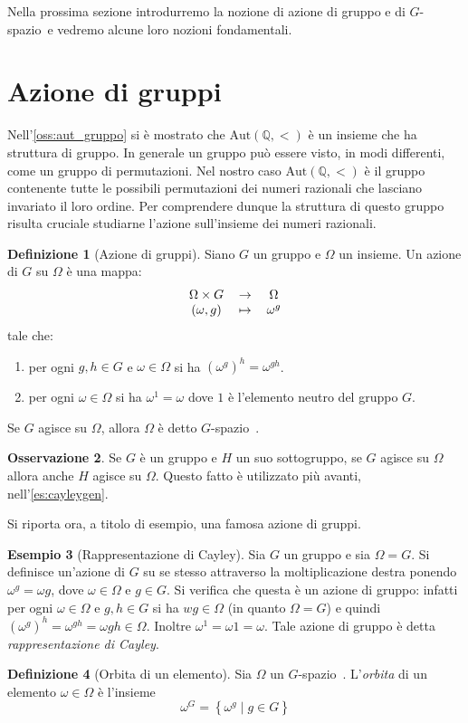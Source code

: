 \documentclass[12pt,a4paper,openright]{report}
\newcommand{\aut}{ \mathrm{Aut} ( \mathbb{Q},< ) } %
\newcommand{\0}{\setminus\{0\}} %
\newcommand{\Gsp}{$G$-spazio~} %
\theoremstyle{definition}
\newtheorem{defn}{Definizione}[chapter]
\newtheorem{oss}[defn]{Osservazione}
\newtheorem{es}[defn]{Esempio}
\theoremstyle{plain}
\begin{document}
Nella prossima sezione introdurremo la nozione di azione di gruppo e di \Gsp e vedremo alcune loro nozioni fondamentali.

\section{Azione di gruppi}

Nell'\cref{oss:aut_gruppo} si è mostrato che $\aut$ è un insieme che ha struttura di gruppo. In generale un gruppo può essere visto, in modi differenti, come un gruppo di permutazioni. Nel nostro caso $\aut$ è il gruppo contenente tutte le possibili permutazioni dei numeri razionali che lasciano invariato il loro ordine. Per comprendere dunque la struttura di questo gruppo risulta cruciale studiarne l'azione sull'insieme dei numeri razionali.

\begin{defn}[Azione di gruppi]
Siano $G$ un gruppo e $\Omega$ un insieme. Un azione di $G$ su $\Omega$ è una mappa:
\[\begin{tabular}{ccc}
$\Omega \times G$ & $\rightarrow$ & $\Omega$ \\ 
$(\omega,g)$ & $\mapsto$ & $\omega^g$
\end{tabular}\]
tale che:
\begin{enumerate}
\item per ogni $g,h \in G$ e $\omega \in \Omega$ si ha $(\omega^g)^h=\omega^{gh}$.
\item per ogni $\omega \in \Omega$ si ha $\omega^1=\omega$ dove $1$ è l'elemento neutro del gruppo $G$.
\end{enumerate}
Se $G$ agisce su $\Omega$, allora $\Omega$ è detto \Gsp.
\end{defn}
\begin{oss}
    Se $G$ è un gruppo e $H$ un suo sottogruppo, se $G$ agisce su $\Omega$ allora anche $H$ agisce su $\Omega$. Questo fatto è utilizzato più avanti, nell'\cref{es:cayleygen}.
\end{oss}
Si riporta ora, a titolo di esempio, una famosa azione di gruppi.
\begin{es}[Rappresentazione di Cayley] 
Sia $G$ un gruppo e sia $\Omega = G$. Si definisce un'azione di $G$ su se stesso attraverso la moltiplicazione destra ponendo $\omega^g =\omega g$, dove $\omega \in \Omega$ e $g \in G$. \newline Si verifica che questa è un azione di gruppo: infatti per ogni $\omega \in \Omega$ e $g,h \in G$ si ha $wg \in \Omega$ (in quanto $\Omega=G$) e quindi $(\omega^g)^h=\omega^{gh}=\omega gh \in \Omega$. Inoltre $\omega^1=\omega 1=\omega$.
Tale azione di gruppo è detta \emph{rappresentazione di Cayley}.
\end{es}
\begin{defn}[Orbita di un elemento]
Sia $\Omega$ un \Gsp. L'\emph{orbita} di un elemento $\omega \in \Omega$ è l'insieme
\[\omega^G = \left\lbrace \omega^g \mid g \in G \right\rbrace \]
\end{defn}
\end{document}
